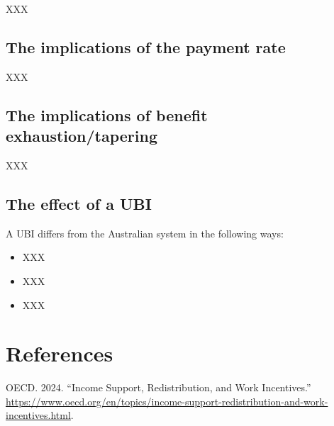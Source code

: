 \documentclass[
  letterpaper,
  DIV=11,
  numbers=noendperiod]{scrreprt}
\newlength{\cslhangindent}
\newlength{\cslentryspacingunit} %
\newenvironment{CSLReferences}[2] %
 {%
  \setlength{\parindent}{0pt}
  \ifodd #1
  \let\oldpar\par
  \def\par{\hangindent=\cslhangindent\oldpar}
  \fi
  \setlength{\parskip}{#2\cslentryspacingunit}
 }%
 {}
\begin{document}
XXX

\hypertarget{the-implications-of-the-payment-rate}{%
\section{The implications of the payment
rate}\label{the-implications-of-the-payment-rate}}

XXX

\hypertarget{the-implications-of-benefit-exhaustiontapering}{%
\section{The implications of benefit
exhaustion/tapering}\label{the-implications-of-benefit-exhaustiontapering}}

XXX

\hypertarget{the-effect-of-a-ubi}{%
\section{The effect of a UBI}\label{the-effect-of-a-ubi}}

A UBI differs from the Australian system in the following ways:

\begin{itemize}
\item
  XXX
\item
  XXX
\item
  XXX
\end{itemize}


\hypertarget{references}{%
\chapter*{References}\label{references}}


\hypertarget{refs}{}
\begin{CSLReferences}{1}{0}
\leavevmode{}%
OECD. 2024. {``{Income Support, Redistribution, and Work Incentives}.''}
\url{https://www.oecd.org/en/topics/income-support-redistribution-and-work-incentives.html}.

\end{CSLReferences}
\end{document}
